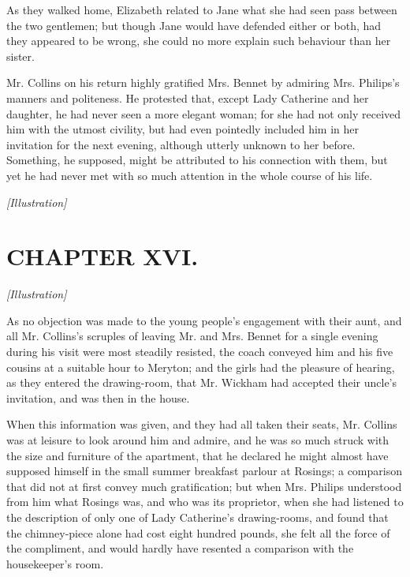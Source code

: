 \documentclass[12pt]{book}
\begin{document}
As they walked home, Elizabeth related to Jane what she had seen pass between the two gentlemen; but though Jane would have defended either or both, had they appeared to be wrong, she could no more explain such behaviour than her sister.

Mr. Collins on his return highly gratified Mrs. Bennet by admiring Mrs. Philips's manners and politeness. He protested that, except Lady Catherine and her daughter, he had never seen a more elegant woman; for she had not only received him with the utmost civility, but had even pointedly included him in her invitation for the next evening, although utterly unknown to her before. Something, he supposed, might be attributed to his connection with them, but yet he had never met with so much attention in the whole course of his life.

\emph{[Illustration]}

\chapter{CHAPTER XVI.}

\emph{[Illustration]}

As no objection was made to the young people's engagement with their aunt, and all Mr. Collins's scruples of leaving Mr. and Mrs. Bennet for a single evening during his visit were most steadily resisted, the coach conveyed him and his five cousins at a suitable hour to Meryton; and the girls had the pleasure of hearing, as they entered the drawing-room, that Mr. Wickham had accepted their uncle's invitation, and was then in the house.

When this information was given, and they had all taken their seats, Mr. Collins was at leisure to look around him and admire, and he was so much struck with the size and furniture of the apartment, that he declared he might almost have supposed himself in the small summer breakfast parlour at Rosings; a comparison that did not at first convey much gratification; but when Mrs. Philips understood from him what Rosings was, and who was its proprietor, when she had listened to the description of only one of Lady Catherine's drawing-rooms, and found that the chimney-piece alone had cost eight hundred pounds, she felt all the force of the compliment, and would hardly have resented a comparison with the housekeeper's room.
\end{document}
